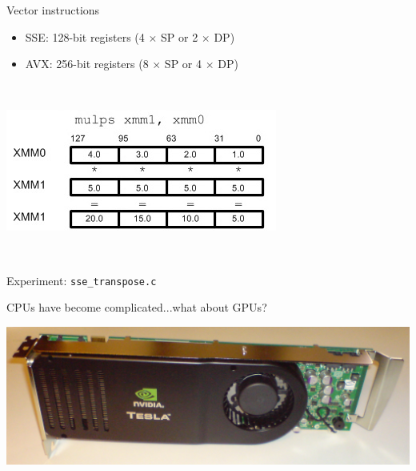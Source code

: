 \documentclass[sans,mathserif]{beamer}
\begin{document}
\begin{frame}{Vector instructions}
  \begin{itemize}
  \item SSE: 128-bit registers (4 $\times$ SP or 2 $\times$ DP)
  \item AVX: 256-bit registers (8 $\times$ SP or 4 $\times$ DP)
  \end{itemize}

~

\includegraphics[width=.6\textwidth]{sse.jpg} 

~

Experiment: {\tt sse\_transpose.c}
\end{frame}




\begin{frame}{CPUs have become complicated...what about GPUs?}

  \includegraphics[width=\textwidth]{nvidiatesla.jpg}
\end{frame}
\end{document}
